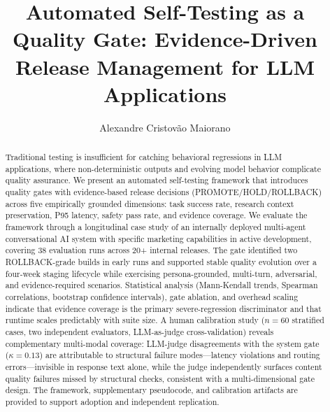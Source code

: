 \documentclass[twocolumn]{svjour3}          %
\begin{document}
\title{Automated Self-Testing as a Quality Gate: Evidence-Driven Release Management for LLM Applications}

\author{Alexandre Cristov\~ao Maiorano}



\maketitle

\begin{abstract}
Traditional testing is insufficient for catching behavioral regressions in LLM applications, where non-deterministic outputs and evolving model behavior complicate quality assurance. We present an automated self-testing framework that introduces quality gates with evidence-based release decisions (PROMOTE/HOLD/ROLLBACK) across five empirically grounded dimensions: task success rate, research context preservation, P95 latency, safety pass rate, and evidence coverage. We evaluate the framework through a longitudinal case study of an internally deployed multi-agent conversational AI system with specific marketing capabilities in active development, covering 38 evaluation runs across 20+ internal releases. The gate identified two ROLLBACK-grade builds in early runs and supported stable quality evolution over a four-week staging lifecycle while exercising persona-grounded, multi-turn, adversarial, and evidence-required scenarios. Statistical analysis (Mann-Kendall trends, Spearman correlations, bootstrap confidence intervals), gate ablation, and overhead scaling indicate that evidence coverage is the primary severe-regression discriminator and that runtime scales predictably with suite size. A human calibration study ($n=60$ stratified cases, two independent evaluators, LLM-as-judge cross-validation) reveals complementary multi-modal coverage: LLM-judge disagreements with the system gate ($\kappa=0.13$) are attributable to structural failure modes---latency violations and routing errors---invisible in response text alone, while the judge independently surfaces content quality failures missed by structural checks, consistent with a multi-dimensional gate design. The framework, supplementary pseudocode, and calibration artifacts are provided to support adoption and independent replication.
\end{abstract}
\end{document}
